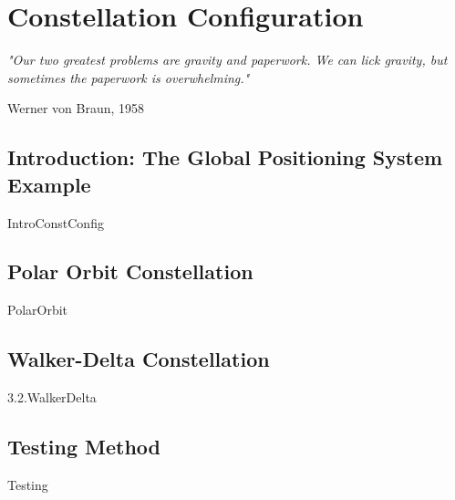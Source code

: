 \chapter{Constellation Configuration}

\epigraph{\textit{"Our two greatest problems are gravity and paperwork. We can lick gravity, but sometimes the paperwork is overwhelming."}}{Werner von Braun, 1958}
\newpage

\section{Introduction: The Global Positioning System Example}
{IntroConstConfig}

\section{Polar Orbit Constellation}
{PolarOrbit}

\section{Walker-Delta Constellation}
{3.2.WalkerDelta}

\section{Testing Method}
{Testing}
